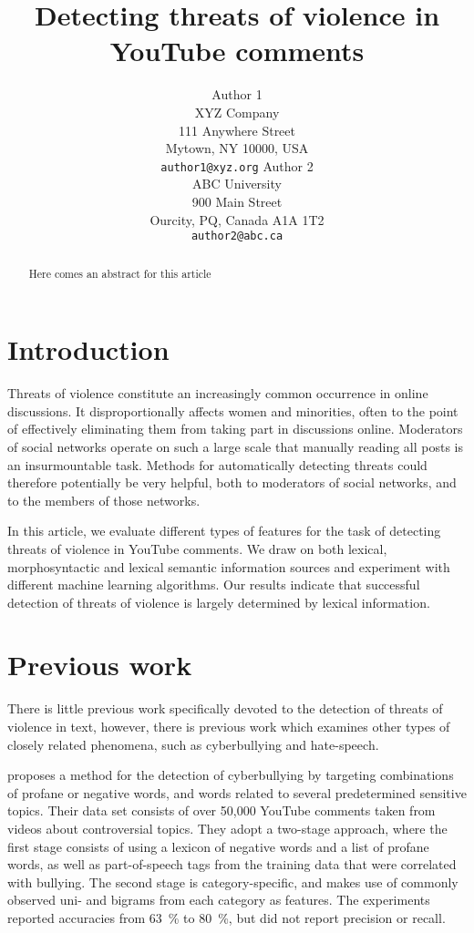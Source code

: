 \documentclass[11pt,letterpaper]{article}
\title{Detecting threats of violence in YouTube comments}
\author{Author 1\\
	    XYZ Company\\
	    111 Anywhere Street\\
	    Mytown, NY 10000, USA\\
	    {\tt author1@xyz.org}
	  \And
	Author 2\\
  	ABC University\\
  	900 Main Street\\
  	Ourcity, PQ, Canada A1A 1T2\\
  {\tt author2@abc.ca}}
\date{}
\begin{document}
\maketitle

\begin{abstract}
Here comes an abstract for this article
\end{abstract}

\section{Introduction}
\label{sec:intro}
Threats of violence constitute an increasingly common occurrence in online
discussions. It disproportionally affects women and minorities, often
to the point of effectively eliminating them from taking part in
discussions online. Moderators of social networks operate on such a
large scale that manually reading all posts is an insurmountable
task. Methods for automatically detecting threats could therefore
potentially be very helpful, both to moderators of social networks,
and to the members of those networks.

In this article, we evaluate different types of features for the task
of detecting threats of violence in YouTube comments. We draw on both
lexical, morphosyntactic and lexical semantic information sources and
experiment with different machine learning algorithms. Our results
indicate that successful detection of threats of violence is largely
determined by lexical information.

\section{Previous work}
\label{sec:prev}
There is little previous work specifically devoted to the detection of
threats of violence in text, however, there is previous work which
examines other types of closely related phenomena, such as
cyberbullying and hate-speech.

 proposes a method for the detection of
cyberbullying by targeting combinations of profane or negative words,
and words related to several predetermined sensitive topics. Their
data set consists of over 50,000 YouTube comments taken from videos
about controversial topics. They adopt a two-stage approach, where the
first stage consists of using a lexicon of negative words and a list
of profane words, as well as part-of-speech tags from the training
data that were correlated with bullying. The second stage is
category-specific, and makes use of commonly observed uni- and bigrams
from each category as features. The experiments reported accuracies
from 63~\% to 80~\%, but did not report precision or recall.
\end{document}
